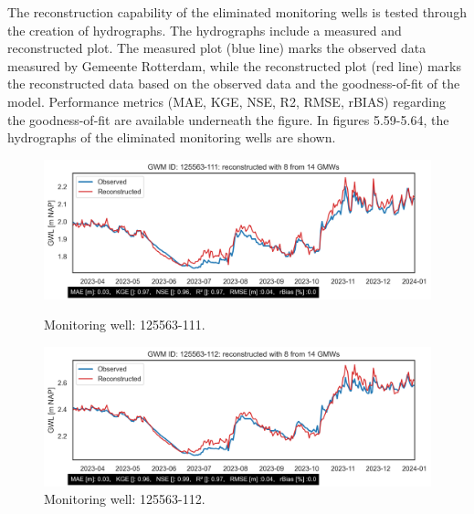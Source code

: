 The reconstruction capability of the eliminated monitoring wells is tested through the creation of hydrographs. The hydrographs include a measured and reconstructed plot. The measured plot (blue line) marks the observed data measured by Gemeente Rotterdam, while the reconstructed plot (red line) marks the reconstructed data based on the observed data and the goodness-of-fit of the model. Performance metrics (MAE, KGE, NSE, R2, RMSE, rBIAS) regarding the goodness-of-fit are available underneath the figure. In figures 5.59-5.64, the hydrographs of the eliminated monitoring wells are shown.
\clearpage


\begin{figure}[h]
    \centering
    \begin{minipage}{0.45\linewidth}
        \includegraphics[width=\linewidth]{GWM_reconstructed125563-111.png}
        \caption{Monitoring well: 125563-111.}
        \label{fig:label1}
    \end{minipage}
    \hfill
    \begin{minipage}{0.45\linewidth}
        \includegraphics[width=\linewidth]{GWM_reconstructed125563-112.png}
        \caption{Monitoring well: 125563-112.}
        \label{fig:label2}
    \end{minipage}
    

\end{figure}
